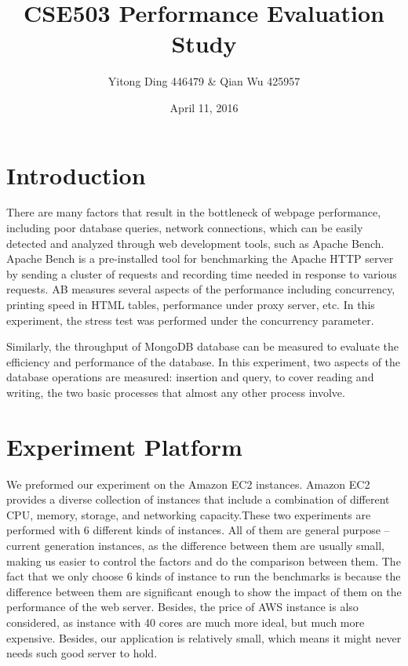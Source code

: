 \documentclass[10pt,letterpaper]{article}
\title{CSE503 Performance Evaluation Study}
\author{Yitong Ding 446479 \& Qian Wu 425957}
\date{April 11, 2016}
\begin{document}
\maketitle

\tableofcontents

\newpage



\section{Introduction}
There are many factors that result in the bottleneck of webpage performance, including poor database queries, network connections, which can be easily detected and analyzed through web development tools, such as Apache Bench. Apache Bench is a pre-installed tool for benchmarking the Apache HTTP server by sending a cluster of requests and recording time needed in response to various requests.  AB measures several aspects of the performance including concurrency, printing speed in HTML tables, performance under proxy server, etc. In this experiment, the stress test was performed under the concurrency parameter.

Similarly, the throughput of MongoDB database can be measured to evaluate the efficiency and performance of the database. In this experiment, two aspects of the database operations are measured: insertion and query, to cover reading and writing, the two basic processes that almost any other process involve.


\section{Experiment Platform}
We preformed our experiment on the Amazon EC2 instances. Amazon EC2 provides a diverse collection of instances that include a combination of different CPU, memory, storage, and networking capacity.These two experiments are performed with 6 different kinds of instances. All of them are general purpose – current generation instances, as the difference between them are usually small, making us easier to control the factors and do the comparison between them. The fact that we only choose 6 kinds of instance to run the benchmarks is because the difference between them are significant enough to show the impact of them on the performance of the web server. Besides, the price of AWS instance is also considered, as instance with 40 cores are much more ideal, but much more expensive. Besides, our application is relatively small, which means it might never needs such good server to hold. 
\end{document}
